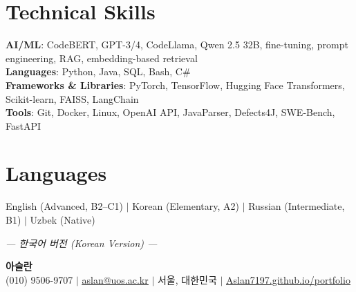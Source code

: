 \documentclass[letterpaper,11pt]{article}
\begin{document}
\section{Technical Skills}
 \begin{itemize}[leftmargin=0.15in, label={}]
    \small{\item{
     \textbf{AI/ML}{: CodeBERT, GPT-3/4, CodeLlama, Qwen 2.5 32B, fine-tuning, prompt engineering, RAG, embedding-based retrieval} \\
     \textbf{Languages}{: Python, Java, SQL, Bash, C\#} \\
     \textbf{Frameworks \& Libraries}{: PyTorch, TensorFlow, Hugging Face Transformers, Scikit-learn, FAISS, LangChain} \\
     \textbf{Tools}{: Git, Docker, Linux, OpenAI API, JavaParser, Defects4J, SWE-Bench, FastAPI}
    }}
 \end{itemize}


\section{Languages}
 \begin{itemize}[leftmargin=0.15in, label={}]
    \small{\item{
     English (Advanced, B2--C1) $|$ Korean (Elementary, A2) $|$ Russian (Intermediate, B1) $|$ Uzbek (Native)
    }}
 \end{itemize}


\newpage


\begin{center}
\vspace{-25pt}
\small\textit{--- 한국어 버전 (Korean Version) ---}
\end{center}
\vspace{-12pt}

\begin{center}
    \textbf{\Large 아슬란} \\ \vspace{1pt}
    \small (010) 9506-9707 $|$ \href{mailto:aslan@uos.ac.kr}{\underline{aslan@uos.ac.kr}} $|$
    서울, 대한민국 $|$
    \href{https://Aslan7197.github.io/portfolio}{\underline{Aslan7197.github.io/portfolio}}
\end{center}
\end{document}
